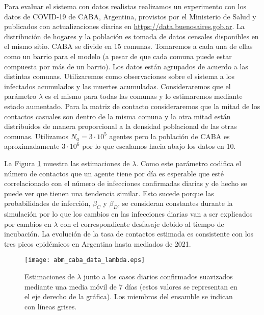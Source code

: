 Para evaluar el sistema con datos realistas realizamos un experimento con los datos de COVID-19 de CABA, Argentina, provistos por el Ministerio de Salud y publicados con actualizaciones diarias en \url{https://data.buenosaires.gob.ar}. La distribución de hogares y la población es tomada de datos censales disponibles en el mismo sitio. CABA se divide en 15 comunas. Tomaremos a cada una de ellas como un barrio para el modelo (a pesar de que cada comuna puede estar compuesta por más de un barrio). Los datos están agrupados de acuerdo a las distintas comunas. Utilizaremos como observaciones sobre el sistema a los infectados acumulados y las muertes acumuladas. Consideraremos que el parámetro $\lambda$ es el mismo para todas las comunas y lo estimaremos mediante estado aumentado. Para la matriz de contacto consideraremos que la mitad de los contactos casuales son dentro de la misma comuna y la otra mitad están distribuidos de manera proporcional a la densidad poblacional de las otras comunas. Utilizamos $N_a = 3 \cdot 10^5$ agentes pero la población de CABA es aproximadamente $3 \cdot 10^6$ por lo que escalamos hacia abajo los datos en 10.

La Figura \ref{fig:abm_caba_data_lambda} muestra las estimaciones de $\lambda$. Como este parámetro codifica el número de contactos que un agente tiene por día es esperable que esté correlacionado con el número de infecciones confirmadas diarias y de hecho se puede ver que tienen una tendencia similar. Esto sucede porque las probabilidades de infección, $\beta_C$ y $\beta_D$, se consideran constantes durante la simulación por lo que los cambios en las infecciones diarias van a ser explicados por cambios en $\lambda$ con el correspondiente desfasaje debido al tiempo de incubación. La evolución de la tasa de contactos estimada es consistente con los tres picos epidémicos en Argentina hasta mediados de 2021.
\begin{figure}[h]
    \centering
    \texttt{[image: abm\_caba\_data\_lambda.eps]}
    \caption{Estimaciones de $\lambda$ junto a los casos diarios confirmados suavizados mediante una media móvil de 7 días (estos valores se representan en el eje derecho de la gráfica). Los miembros del ensamble se indican con líneas grises.}
    \label{fig:abm_caba_data_lambda}
\end{figure}

